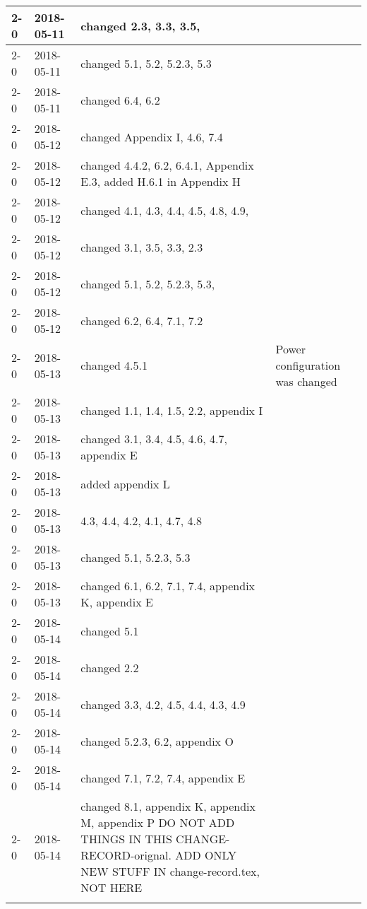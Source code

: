 \begin{longtable}{|p{}| p{} |p{} |p{}|}
    2-0     &   2018-05-11   & changed 2.3, 3.3, 3.5,  &  \\\hline
    2-0     &   2018-05-11   & changed 5.1, 5.2, 5.2.3, 5.3 &  \\\hline
    2-0     &   2018-05-11   & changed 6.4, 6.2 &  \\\hline
    2-0     &   2018-05-12   & changed Appendix I, 4.6, 7.4 & \\ \hline
    2-0     &   2018-05-12   & changed 4.4.2, 6.2, 6.4.1, Appendix E.3, added H.6.1 in Appendix H & \\ \hline
    2-0     &   2018-05-12   & changed 4.1, 4.3, 4.4, 4.5, 4.8, 4.9,  & \\ \hline
    2-0     &   2018-05-12   & changed 3.1, 3.5, 3.3, 2.3 & \\ \hline
    2-0     &   2018-05-12   & changed 5.1, 5.2, 5.2.3, 5.3,  & \\ \hline
    2-0     &   2018-05-12   & changed 6.2, 6.4, 7.1, 7.2 & \\ \hline
    2-0     &   2018-05-13   & changed 4.5.1 & Power configuration was changed \\ \hline
    2-0     &   2018-05-13   & changed 1.1, 1.4, 1.5, 2.2, appendix I \\ \hline
    2-0     &   2018-05-13   & changed 3.1, 3.4, 4.5, 4.6, 4.7, appendix E \\ \hline
    2-0     &   2018-05-13   & added appendix L & \\ \hline
    2-0     &   2018-05-13   & 4.3, 4.4, 4.2, 4.1, 4.7, 4.8\\ \hline
    2-0     &   2018-05-13   & changed 5.1, 5.2.3, 5.3   \\ \hline
    2-0     &   2018-05-13   & changed 6.1, 6.2, 7.1, 7.4, appendix K, appendix E   \\ \hline
    2-0     &   2018-05-14   & changed 5.1 \\ \hline
    2-0     &   2018-05-14   & changed 2.2 \\ \hline
    2-0     &   2018-05-14   & changed 3.3, 4.2, 4.5, 4.4, 4.3, 4.9  \\ \hline
    2-0     &   2018-05-14   & changed 5.2.3, 6.2, appendix O \\ \hline
    2-0     &   2018-05-14   & changed 7.1, 7.2, 7.4, appendix E  \\ \hline
    2-0     &   2018-05-14   & changed 8.1, appendix K, appendix M, appendix P DO NOT ADD THINGS IN THIS CHANGE-RECORD-orignal. ADD ONLY NEW STUFF IN change-record.tex, NOT HERE\\ \hline 
    \label{COR}
\end{longtable}